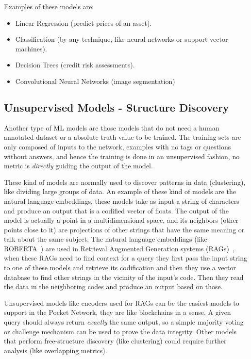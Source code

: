 Examples of these models are:
\begin{itemize}
    \item Linear Regression (predict prices of an asset).
    \item Classification (by any technique, like neural networks or support vector machines).
    \item Decision Trees (credit risk assessments).
    \item Convolutional Neural Networks (image segmentation)
\end{itemize}

\subsection{Unsupervised Models - Structure Discovery}

Another type of ML models are those models that do not need a human annotated dataset or a absolute truth value to be trained. The training sets are only composed of inputs to the network, examples with no tags or questions without answers, and hence the training is done in an unsupervised fashion, no metric is \emph{directly} guiding the output of the model.

These kind of models are normally used to discover patterns in data (clustering), like dividing large groups of data. An example of these kind of models are the natural language embeddings, these models take as input a string of characters and produce an output that is a codified vector of floats. The output of the model is actually a point in a multidimensional space, and its neighbors (other points close to it) are projections of other strings that have the same meaning or talk about the same subject. 
The natural language embeddings (like ROBERTA~\cite{liu2019roberta}) are used in Retrieval Augmented Generation systems (RAGs)~\cite{li2022survey}, when these RAGs need to find context for a query they first pass the input string to one of these models and retrieve its codification and then they use a vector database to find other strings in the vicinity of the input's code. Then they read the data in the neighboring codes and produce an output based on those.

Unsupervised models like encoders used for RAGs can be the easiest models to support in the Pocket Network, they are like blockchains in a sense. A given query should always return \emph{exactly} the same output, so a simple majority voting or challenge mechanism can be used to prove the data integrity. Other models that perform free-structure discovery (like clustering) could require further analysis (like overlapping metrics).


